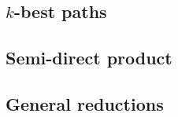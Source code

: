 \documentclass[10pt]{article}
\newcommand{\NN}{\mathbb{N}}
\newcommand{\BB}{\mathbb{B}}
\newcommand{\propname}[1]{{\mathbb{#1}}}
\begin{document}
\subsection{$k$-best paths}






\subsection{Semi-direct product}

\subsection{General reductions}


\end{document}
